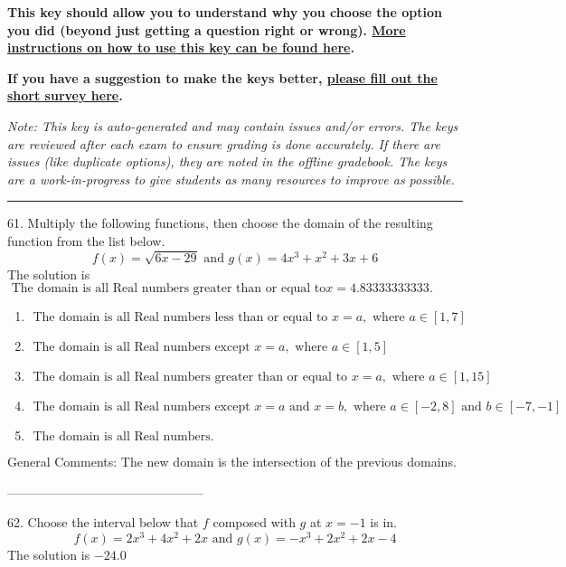 \documentclass{extbook}[14pt]
\begin{document}
\textbf{This key should allow you to understand why you choose the option you did (beyond just getting a question right or wrong). \href{https://xronos.clas.ufl.edu/mac1105spring2020/courseDescriptionAndMisc/Exams/LearningFromResults}{More instructions on how to use this key can be found here}.}

\textbf{If you have a suggestion to make the keys better, \href{https://forms.gle/CZkbZmPbC9XALEE88}{please fill out the short survey here}.}

\textit{Note: This key is auto-generated and may contain issues and/or errors. The keys are reviewed after each exam to ensure grading is done accurately. If there are issues (like duplicate options), they are noted in the offline gradebook. The keys are a work-in-progress to give students as many resources to improve as possible.}

\rule{\textwidth}{0.4pt}

61. Multiply the following functions, then choose the domain of the resulting function from the list below.
\[ f(x) = \sqrt{6x-29}  \text{ and } g(x) = 4x^{3} + x^{2} +3 x + 6 \] 
The solution is $ \text{ The domain is all Real numbers greater than or equal to} x = 4.83333333333. $ 

\begin{enumerate}[label=\Alph*.] 
\item $ \text{ The domain is all Real numbers less than or equal to } x = a, \text{ where } a \in [1, 7] $ 

  
\item $ \text{ The domain is all Real numbers except } x = a, \text{ where } a \in [1, 5] $ 

  
\item $ \text{ The domain is all Real numbers greater than or equal to } x = a, \text{ where } a \in [1, 15] $ 

  
\item $ \text{ The domain is all Real numbers except } x = a \text{ and } x = b, \text{ where } a \in [-2, 8] \text{ and } b \in [-7, -1] $ 

  
\item $ \text{ The domain is all Real numbers. } $ 

  
\end{enumerate} 
 
General Comments: The new domain is the intersection of the previous domains.

-----------------------------------------------

62. Choose the interval below that $f$ composed with $g$ at $x=-1$ is in.
\[ f(x) = 2x^{3} +4 x^{2} +2 x \text{ and } g(x) = -x^{3} +2 x^{2} +2 x -4 \] 
The solution is $ -24.0 $ 
\end{document}
